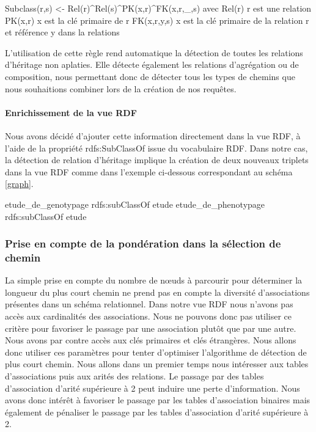 \begin{verbatimtab}
Subclass(r,s) <- Rel(r)^Rel(s)^PK(x,r)^FK(x,r,_,s)
avec
Rel(r)	r est une relation
PK(x,r)	x est la clé primaire de r
FK(x,r,y,s) x est la clé primaire de la relation r 
	et référence y dans la relations
\end{verbatimtab}

L'utilisation de cette règle rend automatique la détection de toutes les relations d'héritage non aplaties. Elle détecte également les relations d'agrégation ou de composition, nous permettant donc de détecter tous les types de chemins que nous souhaitions combiner lors de la création de nos requêtes.

\paragraph*{Enrichissement de la vue RDF}
Nous avons décidé d'ajouter cette information directement dans la vue RDF, à l'aide de la propriété rdfs:SubClassOf issue du vocabulaire RDF. Dans notre cas, la détection de relation d'héritage implique la création de deux nouveaux triplets dans la vue RDF comme dans l'exemple ci-dessous correspondant au schéma \ref{graph}. 

\begin{verbatimtab}
etude_de_genotypage 	rdfs:subClassOf 	etude
etude_de_phenotypage	rdfs:subClassOf 	etude
\end{verbatimtab}

\subsubsection*{Prise en compte de la pondération dans la sélection de chemin}
La simple prise en compte du nombre de nœuds à parcourir pour déterminer la longueur du plus court chemin ne prend pas en compte la diversité d'associations présentes dans un schéma relationnel. Dans notre vue RDF nous n'avons pas accès aux cardinalités des associations. Nous ne pouvons donc pas utiliser ce critère pour favoriser le passage par une association plutôt que par une autre. Nous avons par contre accès aux clés primaires et clés étrangères. Nous allons donc utiliser ces paramètres pour tenter d'optimiser l'algorithme de détection de plus court chemin. Nous allons dans un premier temps nous intéresser aux tables d'associations puis aux arités des relations. Le passage par des tables d'association d'arité supérieure à 2 peut induire une perte d'information. Nous avons donc intérêt à favoriser le passage par les tables d'association binaires mais également de pénaliser le passage par les tables d'association d'arité supérieure à 2.

